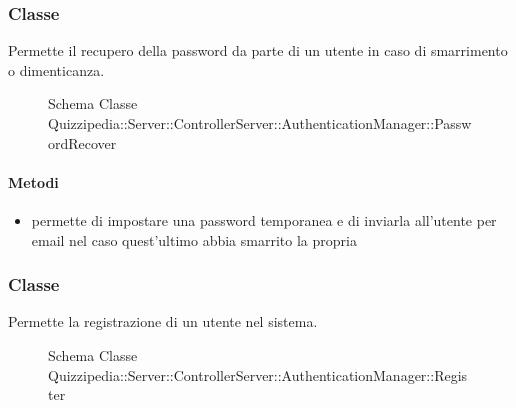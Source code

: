 \subsubsection{Classe }
Permette il recupero della password da parte di un utente in caso di smarrimento o dimenticanza.
\begin{figure}[H]
\centering
\noindent{}
\caption[Schema Classe PasswordRecover]{Schema Classe Quizzipedia::Server::ControllerServer::AuthenticationManager::PasswordRecover}
\end{figure}
\paragraph{Metodi}
\begin{itemize}
\item {}
\newline
permette di impostare una password temporanea e di inviarla all'utente per email nel caso quest'ultimo abbia smarrito la propria
\newline
\end{itemize}
\subsubsection{Classe }
Permette la registrazione di un utente nel sistema.
\begin{figure}[H]
\centering
\noindent{}
\caption[Schema Classe Register]{Schema Classe Quizzipedia::Server::ControllerServer::AuthenticationManager::Register}
\end{figure}
